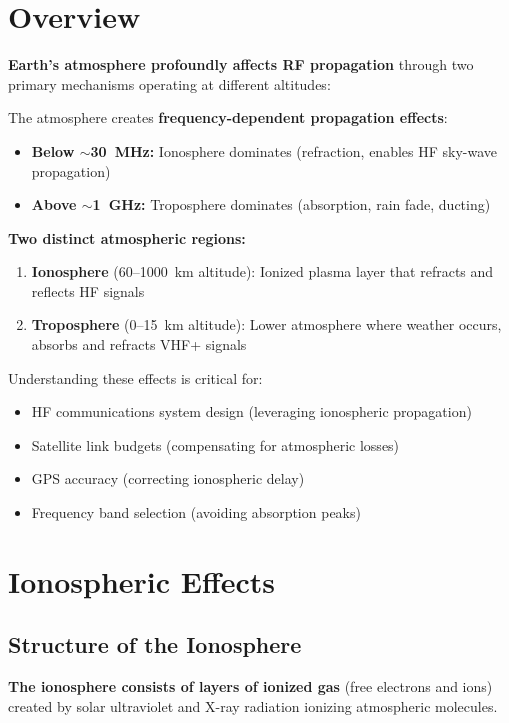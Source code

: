 \section{Overview}

\textbf{Earth's atmosphere profoundly affects RF propagation} through two primary mechanisms operating at different altitudes:

\begin{keyconcept}
The atmosphere creates \textbf{frequency-dependent propagation effects}:
\begin{itemize}
\item \textbf{Below $\sim$30~MHz:} Ionosphere dominates (refraction, enables HF sky-wave propagation)
\item \textbf{Above $\sim$1~GHz:} Troposphere dominates (absorption, rain fade, ducting)
\end{itemize}
\end{keyconcept}

\textbf{Two distinct atmospheric regions:}
\begin{enumerate}
\item \textbf{Ionosphere} (60--1000~km altitude): Ionized plasma layer that refracts and reflects HF signals
\item \textbf{Troposphere} (0--15~km altitude): Lower atmosphere where weather occurs, absorbs and refracts VHF+ signals
\end{enumerate}

Understanding these effects is critical for:
\begin{itemize}
\item HF communications system design (leveraging ionospheric propagation)
\item Satellite link budgets (compensating for atmospheric losses)
\item GPS accuracy (correcting ionospheric delay)
\item Frequency band selection (avoiding absorption peaks)
\end{itemize}

\section{Ionospheric Effects}

\subsection{Structure of the Ionosphere}

\textbf{The ionosphere consists of layers of ionized gas} (free electrons and ions) created by solar ultraviolet and X-ray radiation ionizing atmospheric molecules.

